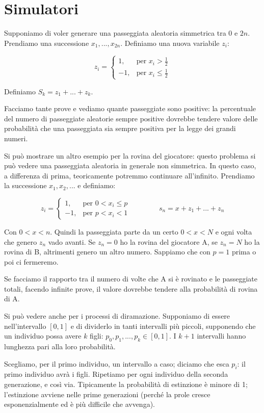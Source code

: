 \documentclass[a4paper,12pt]{book}
\begin{document}
\section{Simulatori}
Supponiamo di voler generare una passeggiata aleatoria simmetrica tra 0 e $ 2n $. Prendiamo una successione $ x_1, ..., x_{2n} $. Definiamo una nuova variabile $ z_i $:

$$
z_i =
\begin{cases}
	1, & \text{per } x_i > \frac{1}{2}\\
	-1, & \text{per } x_i \le \frac{1}{2}
\end{cases}
$$

Definiamo $ S_k = z_1 + ... + z_k $.

Facciamo tante prove e vediamo quante passeggiate sono positive: la percentuale del numero di passeggiate aleatorie sempre positive dovrebbe tendere valore delle probabilità che una passeggiata sia sempre positiva per la legge dei grandi numeri. 

Si può mostrare un altro esempio per la rovina del giocatore: questo problema si può vedere una passeggiata aleatoria in generale non simmetrica. In questo caso, a differenza di prima, teoricamente potremmo continuare all'infinito. Prendiamo la successione $ x_1, x_2, ... $ e definiamo:

$$
	z_i =
	\begin{cases}
		1, & \text{per } 0 < x_i \le p\\
		-1, & \text{per } p < x_i < 1
	\end{cases}
	\qquad \qquad s_n = x + z_1 + ... + z_n
$$

Con $ 0 < x < n $. Quindi la passeggiata parte da un certo $ 0 < x < N $ e ogni volta che genero $ z_n $ vado avanti. Se $ z_n = 0 $ ho la rovina del giocatore A, se $ z_n  = N $ ho la rovina di B, altrimenti genero un altro numero. Sappiamo che con $ p = 1 $ prima o poi ci fermeremo. 

Se facciamo il rapporto tra il numero di volte che A si è rovinato e le passeggiate totali, facendo infinite prove, il valore dovrebbe tendere alla probabilità di rovina di A. 

Si può vedere anche per i processi di diramazione. Supponiamo di essere nell'intervallo $ [0,1] $ e di dividerlo in tanti intervalli più piccoli, supponendo che un individuo possa avere $ k $ figli: $ p_0, p_1, ..., p_k  \in [0,1]$. I $ k+1 $ intervalli hanno lunghezza pari alla loro probabilità. 

Scegliamo, per il primo individuo, un intervallo a caso; diciamo che esca $ p_i $: il primo individuo avrà i figli. Ripetiamo per ogni individuo della seconda generazione, e così via. Tipicamente la probabilità di estinzione è minore di 1; l'estinzione avviene nelle prime generazioni (perché la prole cresce esponenzialmente ed è più difficile che avvenga).
\end{document}
